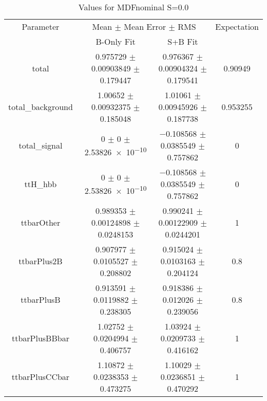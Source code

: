 \begin{table}
\centering
\caption{Values for MDFnominal S=0.0}
\begin{tabular}{cccc}
\toprule
Parameter & \multicolumn{2}{c}{Mean $\pm$ Mean Error $\pm$ RMS} & Expectation\\
 & B-Only Fit & S+B Fit & \\
\midrule
total & \num{0.975729} $\pm$ \num{0.00903849} $\pm$ \num{0.179447} & \num{0.976367} $\pm$ \num{0.00904324} $\pm$ \num{0.179541} & \num{0.90949}\\
total\_background & \num{1.00652} $\pm$ \num{0.00932375} $\pm$ \num{0.185048} & \num{1.01061} $\pm$ \num{0.00945926} $\pm$ \num{0.187738} & \num{0.953255}\\
total\_signal & \num{0} $\pm$ \num{0} $\pm$ \num{2.53826e-10} & \num{-0.108568} $\pm$ \num{0.0385549} $\pm$ \num{0.757862} & \num{0}\\
ttH\_hbb & \num{0} $\pm$ \num{0} $\pm$ \num{2.53826e-10} & \num{-0.108568} $\pm$ \num{0.0385549} $\pm$ \num{0.757862} & \num{0}\\
ttbarOther & \num{0.989353} $\pm$ \num{0.00124898} $\pm$ \num{0.0248153} & \num{0.990241} $\pm$ \num{0.00122909} $\pm$ \num{0.0244201} & \num{1}\\
ttbarPlus2B & \num{0.907977} $\pm$ \num{0.0105527} $\pm$ \num{0.208802} & \num{0.915024} $\pm$ \num{0.0103163} $\pm$ \num{0.204124} & \num{0.8}\\
ttbarPlusB & \num{0.913591} $\pm$ \num{0.0119882} $\pm$ \num{0.238305} & \num{0.918386} $\pm$ \num{0.012026} $\pm$ \num{0.239056} & \num{0.8}\\
ttbarPlusBBbar & \num{1.02752} $\pm$ \num{0.0204994} $\pm$ \num{0.406757} & \num{1.03924} $\pm$ \num{0.0209733} $\pm$ \num{0.416162} & \num{1}\\
ttbarPlusCCbar & \num{1.10872} $\pm$ \num{0.0238353} $\pm$ \num{0.473275} & \num{1.10029} $\pm$ \num{0.0236851} $\pm$ \num{0.470292} & \num{1}\\
\bottomrule
\end{tabular}
\end{table}